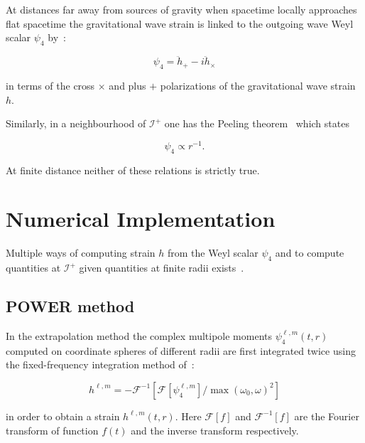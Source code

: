 At distances far away from sources of gravity when spacetime locally
approaches flat spacetime the gravitational wave strain is linked to the
outgoing wave Weyl scalar $\psi_4$ by~\cite{POWER-Reisswig:2010di}:

\begin{equation}
\psi_4 = \ddot h_{+} - i \ddot h_{\times}
\label{eqn:psi4fromstrain}
\end{equation}

in terms of the cross $\times$ and plus $+$ polarizations of the gravitational
wave strain $h$.

Similarly, in a neighbourhood of $\mathcal{I}^+$ one has the Peeling
theorem~\cite{POWER-Wald:1984rg,POWER-Hinder:2011xx} which states

\begin{equation}
\psi_4 \propto r^{-1} \textrm{.}
\label{eqn:peeling}
\end{equation}

At finite distance neither of these relations is strictly true.

\section{Numerical Implementation}

Multiple ways of computing strain $h$ from the Weyl scalar $\psi_4$ and to
compute quantities at $\mathcal{I}^+$ given quantities at finite radii
exists~\cite{POWER-Taylor:2013zia, POWER-Nakano:2015pta}.

\subsection{POWER method}\label{sec:power-method}

In the extrapolation method the complex multipole moments
$\psi_4^{\ell,m}(t,r)$ computed on coordinate spheres of different radii are
first integrated twice using the fixed-frequency integration method
of~\cite{POWER-Reisswig:2010di}:

\begin{equation}
h^{\ell,m} =
-\mathcal{F}^{-1}\left[
  \mathcal{F}\left[\psi_4^{\ell,m}\right] /
  \mathop{max}(\omega_0,\omega)^2
\right]
\label{eqn:ffi}
\end{equation}

in order to obtain a strain $h^{\ell,m}(t,r)$. Here $\mathcal{F}[f]$ and
$\mathcal{F}^{-1}[f]$ are the
Fourier transform of function $f(t)$ and the inverse transform respectively.

